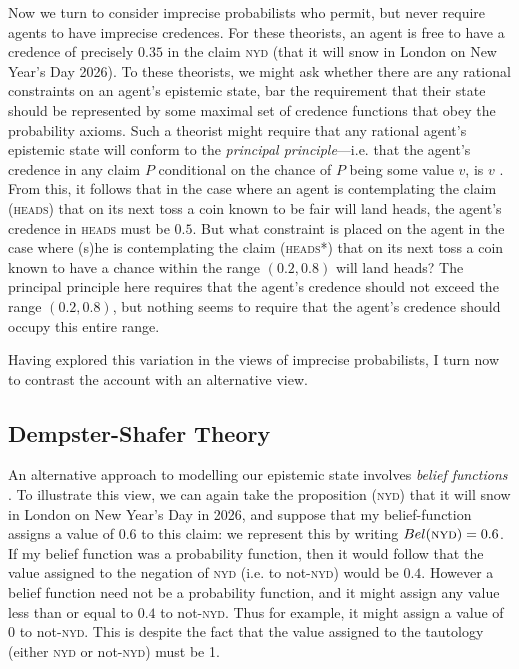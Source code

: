 Now we turn to consider imprecise probabilists who permit, but never require agents to have imprecise credences. For these theorists, an agent is free to have a credence of precisely $0.35$ in the claim \textsc{nyd} (that it will snow in London on New Year's Day 2026). To these theorists, we might ask whether there are any rational constraints on an agent's epistemic state, bar the requirement that their state should be represented by some maximal set of credence functions that obey the probability axioms. Such a theorist might require that any rational agent's epistemic state will conform to the \textit{principal principle}---i.e. that the agent's credence in any claim $P$ conditional on the chance of $P$ being some value $v$, is $v$  \citep{Lewis1980:mahtani}. From this, it follows that in the case where an agent is contemplating the claim (\textsc{heads}) that on its next toss a coin known to be fair will land heads, the agent's credence in \textsc{heads} must be $0.5$. But what constraint is placed on the agent in the case where (s)he is contemplating the claim (\textsc{heads}*) that on its next toss a coin known to have a chance within the range $(0.2, 0.8)$ will land heads? The principal principle here requires that the agent's credence should not exceed the range $(0.2, 0.8)$, but nothing seems to require that the agent's credence should occupy this entire range. 

Having explored this variation in the views of imprecise probabilists, I turn now to contrast the account with an alternative view. 

\subsection{Dempster-Shafer Theory}

An alternative approach to modelling our epistemic state involves \textit{belief functions} \citep{dempster1967,dempster1968,shafer1976}. To illustrate this view, we can again take the proposition (\textsc{nyd}) that it will snow in London on New Year's Day in 2026, and suppose that my belief-function assigns a value of $0.6$ to this claim: we represent this by writing $Bel(\text{\textsc{nyd}})=0.6$. If my belief function was a probability function, then it would follow that the value assigned to the negation of \textsc{nyd} (i.e. to not-\textsc{nyd}) would be $0.4$. However a belief function need not be a probability function, and it might assign any value less than or equal to $0.4$ to not-\textsc{nyd}. Thus for example, it might assign a value of $0$ to not-\textsc{nyd}. This is despite the fact that the value assigned to the tautology (either \textsc{nyd} or not-\textsc{nyd}) must be 1. 

